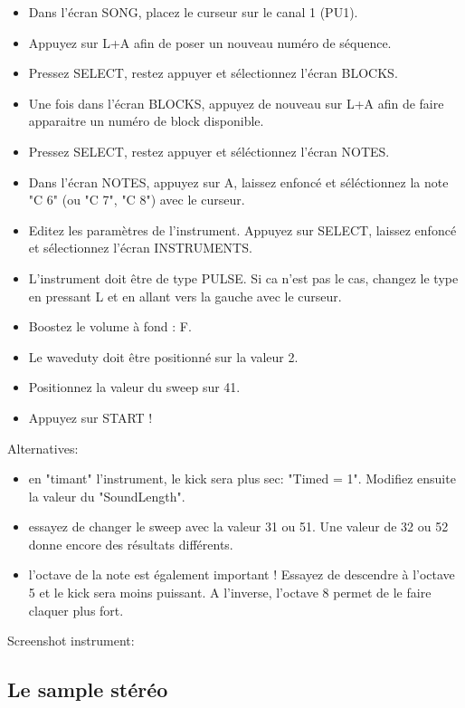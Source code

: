 \documentclass[12pt,a4paper]{article}
\begin{document}
    \begin{itemize}
    \item{Dans l'écran SONG, placez le curseur sur le canal 1 (PU1).}
    \item{Appuyez sur L+A afin de poser un nouveau numéro de séquence.}
    \item{Pressez SELECT, restez appuyer et sélectionnez l'écran BLOCKS.}
    \item{Une fois dans l'écran BLOCKS, appuyez de nouveau sur L+A afin de faire apparaitre un numéro de block disponible.}
    \item{Pressez SELECT, restez appuyer et séléctionnez l'écran NOTES.}
    \item{Dans l'écran NOTES, appuyez sur A, laissez enfoncé et séléctionnez la note "C 6" (ou "C 7", "C 8") avec le curseur.}
    \item{Editez les paramètres de l'instrument. Appuyez sur SELECT, laissez enfoncé et sélectionnez l'écran INSTRUMENTS.}
    \item{L'instrument doit être de type PULSE. Si ca n'est pas le cas, changez le type en pressant L et en allant vers la gauche avec le curseur.}
    \item{Boostez le volume à fond : F.}
    \item{Le waveduty doit être positionné sur la valeur 2.}
    \item{Positionnez la valeur du sweep sur 41.}
    \item{Appuyez sur START !}
    \end{itemize}\medskip

    Alternatives:
    \medskip

    \begin{itemize}
    \item{en "timant" l'instrument, le kick sera plus sec: "Timed = 1". Modifiez ensuite la valeur du "SoundLength".}
    \item{essayez de changer le sweep avec la valeur 31 ou 51. Une valeur de 32 ou 52 donne encore des résultats différents.}
    \item{l'octave de la note est également important ! Essayez de descendre à l'octave 5 et le kick sera moins puissant. A l'inverse, l'octave 8 permet de le faire claquer plus fort.}
    \end{itemize}\medskip

    Screenshot instrument:

    \subsection{Le sample stéréo}
\end{document}
